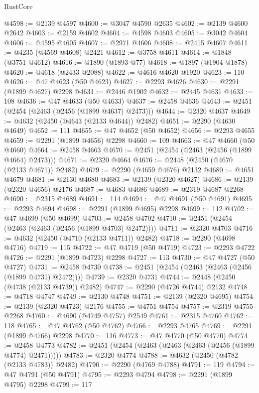 \begin{lexlean}{RustCore}
\begin{coremodule}
@4598 := @2139 @4597
@4600 := @3047 @4590 @2635
@4602 := @2139 @4600 @2642
@4603 := @2159 @4602
@4604 := @4598 @4603
@4605 := @3042 @4604
@4606 := @4595 @4605
@4607 := @2971 @4606
@4608 := @2415 @4607
@4611 := @4235 (@4569 @4608) @2421
@4612 := @3758 @4611
@4614 := @1848 (@3751 @4612)
@4616 := @1890 (@1893 @77)
@4618 := @1897 (@1904 @1878)
@4620 := @4618 (@2433 @2088)
@4622 := @4616 @4620 @1920
@4623 := 110
@4626 := @47 @4623 (@50 @4623)
@4627 := @2293 @4626
@4630 := @2291 (@1899 @4627) @2298
@4631 := @2446 @1902
@4632 := @2445 @4631
@4633 := 108
@4636 := @47 @4633 (@50 @4633)
@4637 := @2458 @4636
@4643 := @2451 (@2454 (@2463 (@2456 (@1899 @4637) @2473)))
@4644 := @2320 @4637
@4649 := @4632 (@2450 (@4643 (@2133 @4644)) @2482)
@4651 := @2290 (@4630 @4649)
@4652 := 111
@4655 := @47 @4652 (@50 @4652)
@4656 := @2293 @4655
@4659 := @2291 (@1899 @4656) @2298
@4660 := 109
@4663 := @47 @4660 (@50 @4660)
@4664 := @2458 @4663
@4670 := @2451 (@2454 (@2463 (@2456 (@1899 @4664) @2473)))
@4671 := @2320 @4664
@4676 := @2448 (@2450 (@4670 (@2133 @4671)) @2482)
@4679 := @2290 (@4659 @4676) @2132
@4680 := @4651 @4679
@4681 := @2130 @4680
@4683 := @2139 (@2320 @4627)
@4686 := @2139 (@2320 @4656) @2176
@4687 := @4683 @4686
@4689 := @2319 @4687 @2268
@4690 := @2315 @4689
@4691 := 114
@4694 := @47 @4691 (@50 @4691)
@4695 := @2293 @4694
@4698 := @2291 (@1899 @4695) @2298
@4699 := 112
@4702 := @47 @4699 (@50 @4699)
@4703 := @2458 @4702
@4710 := @2451 (@2454 (@2463 (@2463 (@2456 (@1899 @4703) @2472))))
@4711 := @2320 @4703
@4716 := @4632 (@2450 (@4710 (@2133 @4711)) @2482)
@4718 := @2290 (@4698 @4716)
@4719 := 115
@4722 := @47 @4719 (@50 @4719)
@4723 := @2293 @4722
@4726 := @2291 (@1899 @4723) @2298
@4727 := 113
@4730 := @47 @4727 (@50 @4727)
@4731 := @2458 @4730
@4738 := @2451 (@2454 (@2463 (@2463 (@2456 (@1899 @4731) @2472))))
@4739 := @2320 @4731
@4744 := @2448 (@2450 (@4738 (@2133 @4739)) @2482)
@4747 := @2290 (@4726 @4744) @2132
@4748 := @4718 @4747
@4749 := @2130 @4748
@4751 := @2139 (@2320 @4695)
@4754 := @2139 (@2320 @4723) @2176
@4755 := @4751 @4754
@4757 := @2319 @4755 @2268
@4760 := @4690 (@4749 @4757) @2549
@4761 := @2315 @4760
@4762 := 118
@4765 := @47 @4762 (@50 @4762)
@4766 := @2293 @4765
@4769 := @2291 (@1899 @4766) @2298
@4770 := 116
@4773 := @47 @4770 (@50 @4770)
@4774 := @2458 @4773
@4782 := @2451 (@2454 (@2463 (@2463 (@2463 (@2456 (@1899 @4774) @2471)))))
@4783 := @2320 @4774
@4788 := @4632 (@2450 (@4782 (@2133 @4783)) @2482)
@4790 := @2290 (@4769 @4788)
@4791 := 119
@4794 := @47 @4791 (@50 @4791)
@4795 := @2293 @4794
@4798 := @2291 (@1899 @4795) @2298
@4799 := 117

\end{coremodule}
\end{lexlean}
